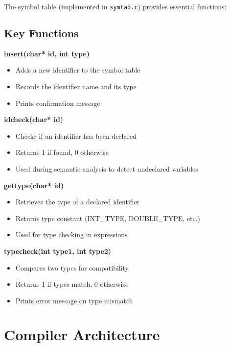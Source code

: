 \documentclass[12pt,a4paper]{article}
\begin{document}
The symbol table (implemented in \texttt{symtab.c}) provides essential functions:

\subsection{Key Functions}

\textbf{insert(char* id, int type)}
\begin{itemize}
    \item Adds a new identifier to the symbol table
    \item Records the identifier name and its type
    \item Prints confirmation message
\end{itemize}

\textbf{idcheck(char* id)}
\begin{itemize}
    \item Checks if an identifier has been declared
    \item Returns 1 if found, 0 otherwise
    \item Used during semantic analysis to detect undeclared variables
\end{itemize}

\textbf{gettype(char* id)}
\begin{itemize}
    \item Retrieves the type of a declared identifier
    \item Returns type constant (INT\_TYPE, DOUBLE\_TYPE, etc.)
    \item Used for type checking in expressions
\end{itemize}

\textbf{typecheck(int type1, int type2)}
\begin{itemize}
    \item Compares two types for compatibility
    \item Returns 1 if types match, 0 otherwise
    \item Prints error message on type mismatch
\end{itemize}

\section{Compiler Architecture}
\end{document}
